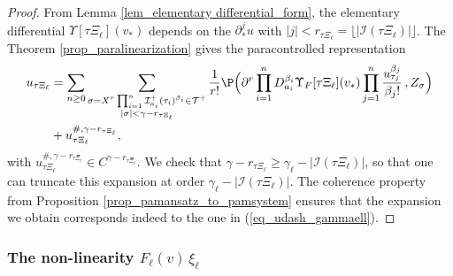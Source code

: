 \documentclass[11pt]{preprint}
\newcommand{\mcI}{\mathcal{I}}
\newcommand{\mcT}{\mathcal{T}}
\def\eqref#1{(\ref{#1})}
\begin{document}
	
	\begin{proof}
		From Lemma \ref{lem_elementary differential_form}, the elementary differential $\Upsilon[\tau\Xi_\ell](v_*)$ depends on the $\partial^j_*u$ with $|j|<r_{\tau\Xi_\ell}= \lfloor |\mcI(\tau\Xi_\ell)|\rfloor$. The Theorem \ref{prop_paralinearization} gives the paracontrolled representation
		\begin{align*}
		u_{\tau\Xi_\ell}& = \sum_{n\geq 0}\sum_{\substack{\sigma=  X^r \prod_{i=1}^{n}\mcI^+_{a_i}(\tau_i)^{\beta_i}\in\mcT^+ \\ |\sigma|<\gamma-r_{\tau\Xi_\ell}}} \frac{1}{ r!}\P\Big( \partial^r \prod_{i=1}^n D_{a_i}^{\beta_i} \Upsilon_F[\tau\Xi_\ell](v_*) \prod_{j=1}^{n} \frac{u_{\tau_j}^{\beta_j}}{\beta_j!} \, ,Z_\sigma\Big) \\ &  + u_{\tau\Xi_\ell}^{\#,\gamma-r_{\tau\Xi_\ell}},
		\end{align*}
		with $u_{\tau\Xi_\ell}^{\#,\gamma-r_{\tau\Xi_\ell}}\in C^{\gamma-r_{\tau\Xi_\ell}}$.
		We check that $\gamma-r_{\tau\Xi_\ell}\geq \gamma_\ell-|\mcI(\tau\Xi_\ell)|$, so that one can truncate this expansion at order $\gamma_\ell-|\mcI(\tau\Xi_\ell)|$. The coherence property from Proposition \ref{prop_pamansatz_to_pamsystem} ensures that the expansion we obtain corresponds indeed to the one in \eqref{eq_udash_gammaell}.
	\end{proof}
	
	
	
	

	
	\subsubsection{The non-linearity $F_\ell(v) \, \xi_\ell$} \label{subsect_productmap}
	
\end{document}
